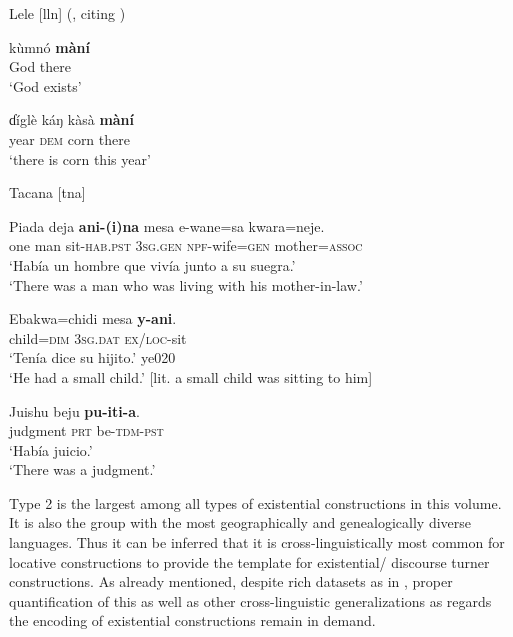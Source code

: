 \documentclass[output=paper,chinesefont,colorlinks,citecolor=brown]{langscibook}
\begin{document}
\begin{exe}
\ex Lele [lln] (, citing \citealt[196]{Frajzyngier2001}) \label{ex:lele-intro}
\begin{xlist}
\ex\label{ex:lele-1}
\gll kùmnó \textbf{màní}\\
God there\\
\glt `God exists'

\ex\label{ex:lele-2} 
\gll ɗíglè káŋ kàsà \textbf{màní}\\ 
year \textsc{dem} corn there\\
\glt `there is corn this year'
\end{xlist}
\end{exe}

\begin{exe}
\ex Tacana [tna] 
\begin{xlist}
\ex \label{ex:tacana-1} 
\gll {\ob}Piada deja{\cb} \textbf{ani-(i)na} {\ob}mesa e-wane=sa kwara=neje{\cb}.\\
one  man  sit-\textsc{hab.pst}  \textsc{3sg.gen}  \textsc{npf}-wife=\textsc{gen}  mother=\textsc{assoc}\\
\glt `Había un hombre que vivía junto a su suegra.'\\
`There was a man who was living with his mother-in-law.'

\ex\label{ex:tacana-posture-sit-child-1}
 \gll Ebakwa=chidi mesa \textbf{y-ani}.\\
 child=\textsc{dim}  \textsc{3sg.dat}  \textsc{ex/loc}-sit\\
\glt `Tenía dice su hijito.' ye020\\
`He had a small child.' [lit. a small child was sitting to him]

\ex\label{ex:tacana-judgement}
\gll Juishu  beju \textbf{pu-iti-a}.\\
judgment  \textsc{prt}  be-\textsc{tdm-pst}\\
\glt `Había juicio.'\\
`There was a judgment.'
\end{xlist}
\end{exe}

Type 2 is the largest among all types of existential constructions in this volume. It is also the group with the most geographically and genealogically diverse languages. Thus it can be inferred that it is cross-linguistically most common for locative constructions to provide the template for existential{\slash} discourse turner constructions. As already mentioned, despite rich datasets as in \citet{creissels2019}, proper quantification of this as well as other cross-linguistic generalizations as regards the encoding of existential constructions remain in demand.
\end{document}
